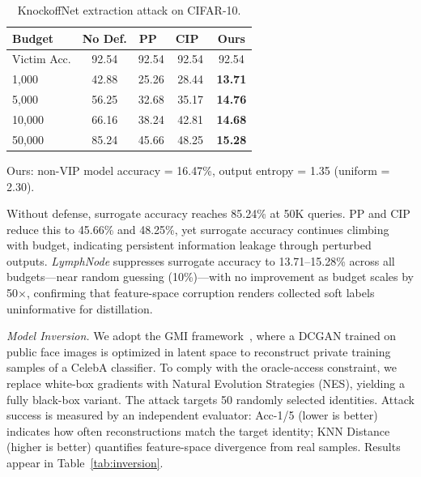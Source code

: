 \documentclass[conference]{IEEEtran}
\begin{document}
\begin{table}[ht]

    \centering
    \caption{KnockoffNet extraction attack on CIFAR-10.}
    \label{tab:extraction}
    \small
    \renewcommand{\arraystretch}{1.25}
    \setlength{\tabcolsep}{6pt}
    
    \begin{tabular}{lcccc}
        \toprule
        \textbf{Budget} & \textbf{No Def.} & \textbf{PP~\cite{orekondy2020prediction}} & \textbf{CIP~\cite{zhang2023cip}} & \textbf{Ours} \\
        \midrule
        Victim Acc. & 92.54 & 92.54 & 92.54 & 92.54 \\
        \midrule
        1,000   & 42.88 & 25.26 & 28.44 & \textbf{13.71} \\
        5,000   & 56.25 & 32.68 & 35.17 & \textbf{14.76} \\
        10,000  & 66.16 & 38.24 & 42.81 & \textbf{14.68} \\
        50,000  & 85.24 & 45.66 & 48.25 & \textbf{15.28} \\
        \bottomrule
    \end{tabular}
    
    \vspace{4pt}
    \parbox{\columnwidth}{\footnotesize Ours: non-VIP model accuracy = 16.47\%, output entropy = 1.35 (uniform = 2.30).}
\end{table}


Without defense, surrogate accuracy reaches 85.24\% at 50K queries. PP and CIP reduce this to 45.66\% and 48.25\%, yet surrogate accuracy continues climbing with budget, indicating persistent information leakage through perturbed outputs. \textit{LymphNode} suppresses surrogate accuracy to 13.71--15.28\% across all budgets---near random guessing (10\%)---with no improvement as budget scales by 50$\times$, confirming that feature-space corruption renders collected soft labels uninformative for distillation.

\noindent\textit{Model Inversion.} We adopt the GMI framework~\cite{zhang2020secret}, where a DCGAN trained on public face images is optimized in latent space to reconstruct private training samples of a CelebA classifier. To comply with the oracle-access constraint, we replace white-box gradients with Natural Evolution Strategies (NES), yielding a fully black-box variant. The attack targets 50 randomly selected identities. Attack success is measured by an independent evaluator: Acc-1/5 (lower is better) indicates how often reconstructions match the target identity; KNN Distance (higher is better) quantifies feature-space divergence from real samples. Results appear in Table~\ref{tab:inversion}.
\end{document}
